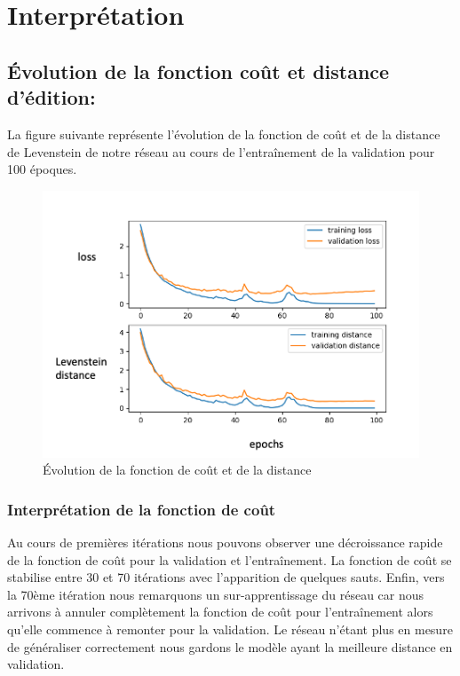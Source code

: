 \newpage
\section{Interprétation }
\subsection{Évolution de la fonction coût et distance d'édition:}

    La figure suivante représente l'évolution de la fonction de coût et de la distance de Levenstein de notre réseau au cours de l'entraînement de la validation pour 100 époques.
    
    \begin{figure}[!ht]
        \centering
        \includegraphics[width=120mm]{sections/images/interpretation/bidirLoss.png}
        \caption{Évolution de la fonction de coût et de la distance}
        \label{fig:Figure 10  }
    \end{figure}
    
    \subsubsection{Interprétation de la fonction de coût}
        Au cours de premières itérations nous pouvons observer une décroissance rapide de la fonction de coût pour la validation et l'entraînement. La fonction de coût se stabilise entre 30 et 70 itérations avec l'apparition de quelques sauts. Enfin, vers la 70ème itération nous remarquons un sur-apprentissage du réseau car nous arrivons à annuler complètement la fonction de coût pour l'entraînement alors qu'elle commence à remonter pour la validation.
        Le réseau n'étant plus en mesure de généraliser correctement nous gardons le modèle ayant la meilleure distance en validation.

